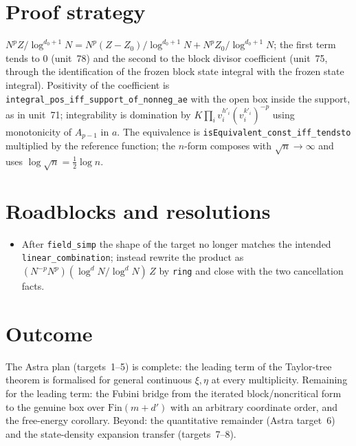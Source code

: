 \documentclass[11pt]{article}
\begin{document}
\section{Proof strategy}
$N^p Z/\log^{d_0+1}N=N^p(Z-Z_0)/\log^{d_0+1}N+N^pZ_0/\log^{d_0+1}N$; the first term tends to $0$
(unit~78) and the second to the block divisor coefficient (unit~75, through the identification of the
frozen block state integral with the frozen state integral). Positivity of the coefficient is
\texttt{integral\_pos\_iff\_support\_of\_nonneg\_ae} with the open box inside the support, as in
unit~71; integrability is domination by $K\prod_iv_i^{h'_i}(v_i^{k'_i})^{-p}$ using monotonicity of
$A_{p-1}$ in $a$. The equivalence is \texttt{isEquivalent\_const\_iff\_tendsto} multiplied by the
reference function; the $n$-form composes with $\sqrt n\to\infty$ and uses
$\log\sqrt n=\tfrac12\log n$.

\section{Roadblocks and resolutions}
\begin{itemize}
\item After \texttt{field\_simp} the shape of the target no longer matches the intended
\texttt{linear\_combination}; instead rewrite the product as
$(N^{-p}N^p)(\log^{d}N/\log^{d}N)\,Z$ by \texttt{ring} and close with the two cancellation facts.
\end{itemize}

\section{Outcome}
The Astra plan (targets~1--5) is complete: the leading term of the Taylor-tree theorem is formalised for
general continuous $\xi,\eta$ at every multiplicity. Remaining for the leading term: the Fubini bridge
from the iterated block/noncritical form to the genuine box over $\mathrm{Fin}(m+d')$ with an arbitrary
coordinate order, and the free-energy corollary. Beyond: the quantitative remainder (Astra target~6) and
the state-density expansion transfer (targets~7--8).
\end{document}
